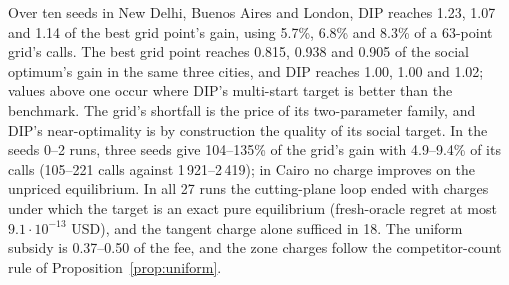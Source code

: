 \documentclass[preprint,11pt]{elsarticle}
\theoremstyle{definition}
\theoremstyle{remark}
\begin{document}
\begin{table}[tbp]\centering\small
\caption{Leader methods, mean over seeds (exact oracle). DIP / grid: DIP gain over the best exact grid point's gain; calls: DIP's oracle calls as a percentage of a 63-point grid at the same calls per point. Gain shares against the social optimum (SO): best grid point, DIP, ARP flat; ARP / DIP gain ratio; $n_{\rm ARP}$ seeds with an ARP run. $^*$: reduced exact grid (lower bounds for the grid column). Shares are not reported where the optimum's gain is below 0.5\% of $|$social cost$|$.}\label{tab:seeds10b}
\end{table}

Over ten seeds in New Delhi, Buenos Aires and London, DIP reaches 1.23, 1.07 and 1.14 of the best grid point's gain, using 5.7\%, 6.8\% and 8.3\% of a 63-point grid's calls. The best grid point reaches 0.815, 0.938 and 0.905 of the social optimum's gain in the same three cities, and DIP reaches 1.00, 1.00 and 1.02; values above one occur where DIP's multi-start target is better than the benchmark. The grid's shortfall is the price of its two-parameter family, and DIP's near-optimality is by construction the quality of its social target. In the seeds 0--2 runs, three seeds give 104--135\% of the grid's gain with 4.9--9.4\% of its calls (105--221 calls against 1\,921--2\,419); in Cairo no charge improves on the unpriced equilibrium. In all 27 runs the cutting-plane loop ended with charges under which the target is an exact pure equilibrium (fresh-oracle regret at most $9.1\cdot10^{-13}$ USD), and the tangent charge alone sufficed in 18. The uniform subsidy is 0.37--0.50 of the fee, and the zone charges follow the competitor-count rule of Proposition~\ref{prop:uniform}.
\end{document}
